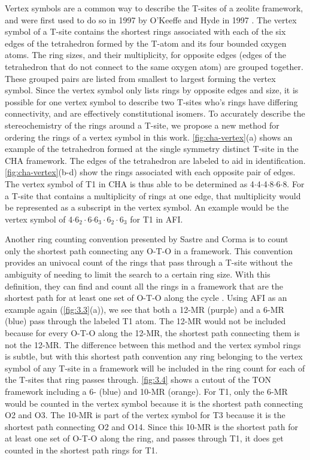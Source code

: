 \documentclass[preprint,numrefs,noinfo,sort&compress]{elsarticle}
\begin{document}
Vertex symbols are a common way to describe the T-sites of a zeolite framework, and were first used to do so in 1997 by O'Keeffe and Hyde in 1997 \cite{okeeffe-vertex-1997}. The vertex symbol of a T-site contains the shortest rings associated with each of the six edges of the tetrahedron formed by the T-atom and its four bounded oxygen atoms. The ring sizes, and  their multiplicity, for opposite edges (edges of the tetrahedron that do not connect to the same oxygen atom) are grouped together. These grouped pairs are listed from smallest to largest forming the vertex symbol. Since the vertex symbol only lists rings by opposite edges and size, it is possible for one vertex symbol to describe two T-sites who's rings have differing connectivity, and are effectively constitutional isomers. To accurately describe the stereochemistry of the rings around a T-site, we propose a new method for ordering the rings of a vertex symbol in this work. \cref{fig:cha-vertex}(a) shows an example of the tetrahedron formed at the single symmetry distinct T-site in the CHA framework. The edges of the tetrahedron are labeled to aid in identification. \cref{fig:cha-vertex}(b-d) show the rings associated with each opposite pair of edges. The vertex symbol of T1 in CHA is thus able to be determined as 4\(\cdot\)4\(\cdot\)4\(\cdot\)8\(\cdot\)6\(\cdot\)8. For a T-site that contains a multiplicity of rings at one edge, that multiplicity would be represented as a subscript in the vertex symbol. An example would be the vertex symbol of 4\(\cdot\)6\(_{\text{2}} \cdot\)6\(\cdot\)6\(_{\text{3}} \cdot\)6\(_{\text{2}} \cdot\)6\(_{\text{3}}\) for T1 in AFI. 

Another ring counting convention presented by Sastre and Corma is to count only the shortest path connecting any O-T-O in a framework. This convention provides an univocal count of the rings that pass through a T-site without the ambiguity of needing to limit the search to a certain ring size. With this definition, they can find and count all the rings in a framework that are the shortest path for at least one set of O-T-O along the cycle \cite{sastre-topological-2009}. Using AFI as an example again (\cref{fig:3.3}(a)), we see that both a 12-MR (purple) and a 6-MR (blue) pass through the labeled T1 atom. The 12-MR would not be included because for every O-T-O along the 12-MR, the shortest path connecting them is not the 12-MR. The difference between this method and the vertex symbol rings is subtle, but with this shortest path convention any ring belonging to the vertex symbol of any T-site in a framework will be included in the ring count for each of the T-sites that ring passes through. \cref{fig:3.4} shows a cutout of the TON framework including a 6- (blue) and 10-MR (orange). For T1, only the 6-MR would be counted in the vertex symbol because it is the shortest path connecting O2 and O3. The 10-MR is part of the vertex symbol for T3 because it is the shortest path connecting O2 and O14. Since this 10-MR is the shortest path for at least one set of O-T-O along the ring, and passes through T1, it does get counted in the shortest path rings for T1. 
\end{document}
